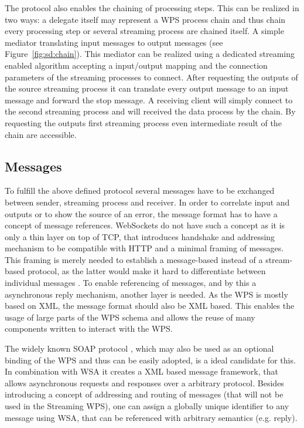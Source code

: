 	The protocol also enables the chaining of processing steps. This can be realized in two ways: a delegate itself may represent a \ac{WPS} process chain and thus chain every processing step or several streaming process are chained itself. A simple mediator translating input messages to output messages (see Figure~\ref{fig:sd:chain}). This mediator can be realized using a dedicated streaming enabled algorithm accepting a input/output mapping and the connection parameters of the streaming processes to connect. After requesting the outputs of the source streaming process it can translate every output message to an input message and forward the stop message. A receiving client will simply connect to the second streaming process and will received the data process by the chain. By requesting the outputs first streaming process even intermediate result of the chain are accessible.

	\subsection{Messages}
		\label{sec:streaming:messages}
		To fulfill the above defined protocol several messages have to be exchanged between sender, streaming process and receiver. In order to correlate input and outputs or to show the source of an error, the message format has to have a concept of message references. WebSockets do not have such a concept as it is only a thin layer on top of TCP, that introduces handshake and addressing mechanism to be compatible with HTTP and a minimal framing of messages. This framing is merely needed to establish a message-based instead of a stream-based protocol, as the latter would make it hard to differentiate between individual messages \citep{ietf:rfc6455}. To enable referencing of messages, and by this a asynchronous reply mechanism, another layer is needed. As the \ac{WPS} is mostly based on \ac{XML}, the message format should also be \ac{XML} based. This enables the usage of large parts of the \ac{WPS} schema and allows the reuse of many components written to interact with the \ac{WPS}.

		The widely known SOAP protocol \citep{w3c:soap1}, which may also be used as an optional binding of the \ac{WPS} and thus can be easily adopted, is a ideal candidate for this. In combination with \ac{WSA} \citep{w3c:wsa} it creates a \ac{XML} based message framework, that allows asynchronous requests and responses over a arbitrary protocol. Besides introducing a concept of addressing and routing of messages (that will not be used in the Streaming \ac{WPS}), one can assign a globally unique identifier to any message using \ac{WSA}, that can be referenced with arbitrary semantics (e.g. reply).

